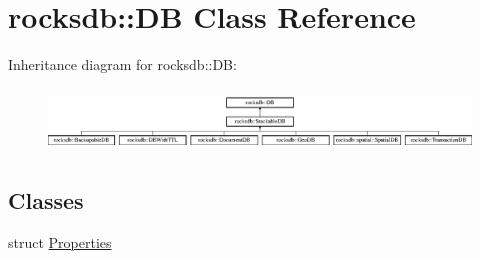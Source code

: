 \hypertarget{classrocksdb_1_1DB}{}\section{rocksdb\+:\+:DB Class Reference}
\label{classrocksdb_1_1DB}
Inheritance diagram for rocksdb\+:\+:DB\+:\begin{figure}[H]
\begin{center}
\leavevmode
\includegraphics[height=1.666667cm]{classrocksdb_1_1DB}
\end{center}
\end{figure}
\subsection*{Classes}
\begin{DoxyCompactItemize}
\item 
struct \hyperlink{structrocksdb_1_1DB_1_1Properties}{Properties}
\end{DoxyCompactItemize}
